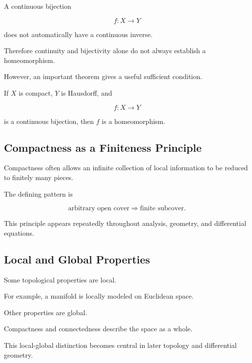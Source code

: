 A continuous bijection

\[
f:X\to Y
\]

does not automatically have a continuous inverse.

Therefore continuity and bijectivity alone do not always establish a
homeomorphism.

However, an important theorem gives a useful sufficient condition.

\begin{theorem}
If \(X\) is compact, \(Y\) is Hausdorff, and

\[
f:X\to Y
\]

is a continuous bijection, then \(f\) is a homeomorphism.
\end{theorem}

\subsection{Compactness as a Finiteness Principle}
\label{subsec:compactness-finiteness-principle}

Compactness often allows an infinite collection of local information to be
reduced to finitely many pieces.

The defining pattern is

\[
\boxed{
\text{arbitrary open cover}
\Longrightarrow
\text{finite subcover}.
}
\]

This principle appears repeatedly throughout analysis, geometry, and
differential equations.

\subsection{Local and Global Properties}
\label{subsec:local-global-topology}

Some topological properties are local.

For example, a manifold is locally modeled on Euclidean space.

Other properties are global.

Compactness and connectedness describe the space as a whole.

This local-global distinction becomes central in later topology and
differential geometry.

